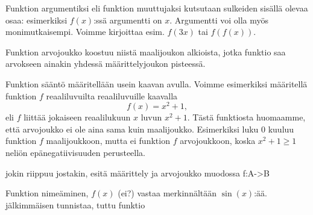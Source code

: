 Funktion argumentiksi eli funktion muuttujaksi kutsutaan sulkeiden sisällä olevaa osaa: esimerkiksi $f(x)$:ssä argumentti on $x$. Argumentti voi olla myös monimutkaisempi. Voimme kirjoittaa esim. $f(3x)$ tai $f(f(x))$.



Funktion arvojoukko koostuu niistä maalijoukon alkioista, jotka funktio saa arvokseen ainakin yhdessä määrittelyjoukon pisteessä.

Funktion sääntö määritellään usein kaavan avulla. Voimme esimerkiksi määritellä funktion $f$ reaaliluvuilta reaaliluvuille kaavalla
\[f(x) = x^2 + 1,\]
eli $f$ liittää jokaiseen reaalilukuun $x$ luvun $x^2+1$. Tästä funktiosta huomaamme, että arvojoukko ei ole aina sama kuin maalijoukko. Esimerkiksi luku $0$ kuuluu funktion $f$ maalijoukkoon, mutta ei funktion $f$ arvojoukkoon, koska $x^2+1\geq 1$ neliön epänegatiivisuuden perusteella.

\begin{esimerkki}

jokin riippuu jostakin, esitä määrittely ja arvojoukko muodossa f:A->B
\end{esimerkki}


Funktion nimeäminen, $f(x)$ (ei?) vastaa merkinnältään $\sin(x)$:ää. jälkimmäisen tunnistaa, tuttu funktio

